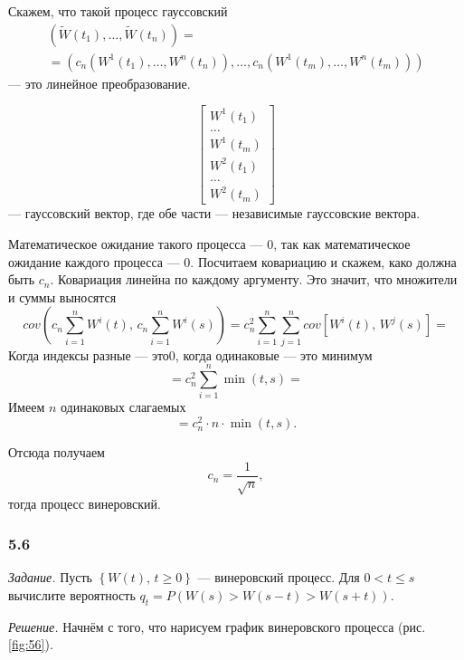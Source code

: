 Скажем, что такой процесс гауссовский
\begin{gather*}
  \left( \tilde{W} \left( t_1 \right), \dotsc, \tilde{W} \left( t_n \right) \right) = \\
  = \left(
    c_n \left( W^1 \left( t_1 \right), \dotsc, W^n \left( t_n \right) \right), \dotsc,
    c_n \left( W^1 \left( t_m \right), \dotsc, W^n \left( t_m \right) \right)
  \right)
\end{gather*}
--- это линейное преобразование.

$$ \begin{bmatrix}
    W^1 \left( t_1 \right) \\
    \dotsc \\
    W^1 \left( t_m \right) \\
    W^2 \left( t_1 \right) \\
    \dotsc \\
    W^2 \left( t_m \right)
  \end{bmatrix}$$
--- гауссовский вектор, где обе части --- независимые гауссовские вектора.

Математическое ожидание такого процесса --- 0, так как математическое ожидание каждого процесса ---
0.
Посчитаем ковариацию и скажем, како должна быть $c_n.$
Ковариация линейна по каждому аргументу.
Это значит, что множители и суммы выносятся
$$cov \left(
    c_n \sum \limits_{i = 1}^n W^i \left( t \right), \,
    c_n \sum \limits_{i = 1}^n W^i \left( s \right)
  \right) =
  c_n^2 \sum \limits_{i = 1}^n
    \sum \limits_{j = 1}^n cov \left[ W^i \left( t \right), \, W^j \left( s \right) \right] =$$
Когда индексы разные --- это0, когда одинаковые --- это минимум
$$= c_n^2 \sum \limits_{i = 1}^n \min \left( t, s \right) =$$
Имеем $n$ одинаковых слагаемых
$$= c_n^2 \cdot n \cdot \min \left( t, s \right).$$

Отсюда получаем
$$c_n =
  \frac{1}{ \sqrt{n}},$$
тогда процесс винеровский.

\subsubsection*{5.6}

\textit{Задание.}
Пусть $ \left\{ W \left( t \right), \, t \geq 0 \right\} $ --- винеровский процесс.
Для $0 < t \leq s$ вычислите вероятность
$q_t =
  P \left( W \left( s \right) > W \left( s - t \right) > W \left( s + t \right) \right) $.

\textit{Решение.}
Начнём с того, что нарисуем график винеровского процесса (рис. \ref{fig:56}).


